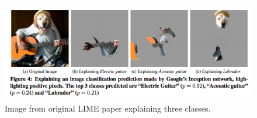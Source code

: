 \begin{figure}[H]
\centering
\includegraphics[width=14cm]{chapters/02_methods/images/lime.png}
\caption{Image from original LIME paper explaining three classes.}
\end{figure}
